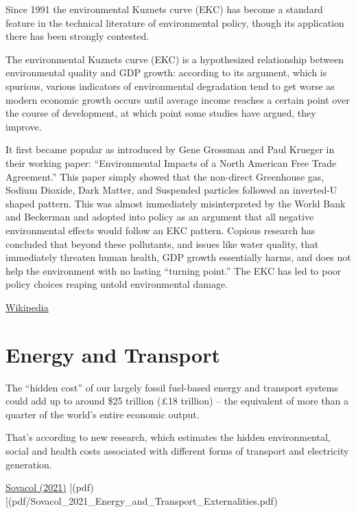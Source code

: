 \documentclass[
]{book}
\begin{document}
Since 1991 the environmental Kuznets curve (EKC) has become
a standard feature in the technical literature of environmental policy,
though its application there has been strongly contested.

The environmental Kuznets curve (EKC) is a hypothesized relationship between environmental quality and
GDP growth:
according to its argument, which is spurious,
various indicators of environmental degradation tend to get worse as modern economic growth occurs
until average income reaches a certain point over the course of development,
at which point some studies have argued, they improve.

It first became popular as introduced by Gene Grossman and Paul Krueger in their working paper:
``Environmental Impacts of a North American Free Trade Agreement.''
This paper simply showed that the non-direct Greenhouse gas, Sodium Dioxide, Dark Matter,
and Suspended particles followed an inverted-U shaped pattern.
This was almost immediately misinterpreted by the World Bank and Beckerman and
adopted into policy as an argument that all negative environmental effects would follow an EKC pattern.
Copious research has concluded that beyond these pollutants, and issues like water quality,
that immediately threaten human health,
GDP growth essentially harms, and does not help the environment with no lasting ``turning point.''
The EKC has led to poor policy choices reaping untold environmental damage.

\href{https://en.wikipedia.org/wiki/Kuznets_curve\#Environmental_Kuznets_curve}{Wikipedia}

\hypertarget{energy-and-transport}{%
\section{Energy and Transport}\label{energy-and-transport}}

The ``hidden cost'' of our largely fossil fuel-based energy and transport systems could add up to around \$25 trillion (£18 trillion) -- the equivalent of more than a quarter of the world's entire economic output.

That's according to new research, which estimates the hidden environmental, social and health costs associated with different forms of transport and electricity generation.

\href{https://www.sciencedirect.com/science/article/pii/S2214629620304606}{Sovacol (2021)}
{[}(pdf){[}(pdf/Sovacol\_2021\_Energy\_and\_Transport\_Externalities.pdf)
\end{document}
